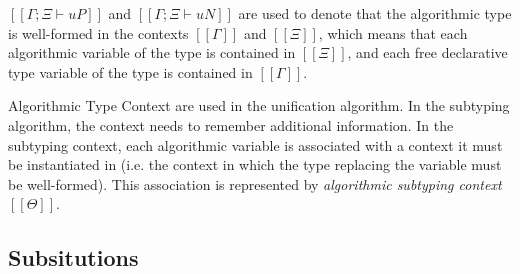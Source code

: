 \documentclass[a4,natbib=false]{article}
\begin{document}

$[[Γ ; Ξ ⊢ uP]]$ and $[[Γ ; Ξ ⊢ uN]]$ are used to denote
that the algorithmic type is well-formed in the contexts
$[[Γ]]$ and $[[Ξ]]$, which means that each algorithmic variable
of the type is contained in $[[Ξ]]$, and each free declarative type variable
of the type is contained in $[[Γ]]$.

\begin{algorithm}
  \hfill
  
  \begin{multicols}{2}
  \ottdefnWFATNauWF{}
  \columnbreak

  \ottdefnWFATPauWF{}
  \end{multicols}

\end{algorithm}


Algorithmic Type Context are used in the unification algorithm.
In the subtyping algorithm, 
the context needs to remember additional information.
In the subtyping context, each algorithmic variable is associated with a
context it must be instantiated in 
(i.e. the context in which the type replacing the variable must be well-formed).
This association is represented by \emph{algorithmic subtyping context} $[[Θ]]$.


\subsection{Subsitutions}
\end{document}
